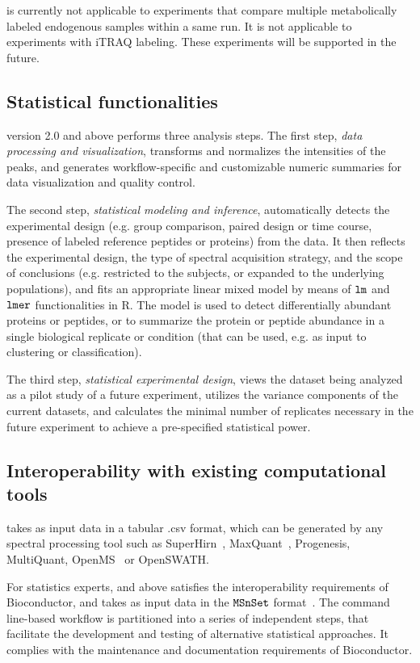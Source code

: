 \documentclass[11pt]{article}
\begin{document}
\m is currently not applicable to experiments that compare multiple metabolically labeled endogenous samples within a same run. It is not applicable to experiments with iTRAQ labeling. These experiments will be supported in the future.

\subsection*{Statistical functionalities}

\m version 2.0 and above performs three analysis steps. The first step, {\it data processing and visualization}, transforms and normalizes the intensities of the peaks, and generates workflow-specific and customizable numeric summaries for data visualization and quality control. 

The second step, {\it statistical modeling and inference}, automatically detects the experimental design (e.g. group comparison, paired design or time course, presence of labeled reference peptides or proteins) from the data. It then reflects the experimental design, the type of spectral acquisition strategy, and the scope of conclusions (e.g. restricted to the subjects, or expanded to the underlying populations), and fits an appropriate linear mixed model by means of $\tt{lm}$ and $\tt{lmer}$ functionalities in R. The model is used to detect differentially abundant proteins or peptides, or to summarize the protein or peptide abundance in a single biological replicate or condition (that can be used, e.g. as input to clustering or classification).

The third step, {\it statistical experimental design}, views the dataset being analyzed as a pilot study of a future experiment, utilizes the variance components of the current datasets, and calculates the minimal number of replicates necessary in the future experiment to achieve a pre-specified statistical power.

\subsection*{Interoperability with existing computational tools}

\m takes as input data in a tabular .csv format, which can be generated by any spectral processing tool such as SuperHirn~\citep{Mueller:2007fo}, MaxQuant~\citep{Cox:2008ir}, Progenesis, MultiQuant, OpenMS~\citep{Sturm:2008eu} or OpenSWATH.

For statistics experts,  and above satisfies the interoperability requirements of Bioconductor, and takes as input data in the $\tt{MSnSet}$ format~\citep{Gatto:2012tj}. The command line-based workflow is partitioned into a series of independent steps, that facilitate the development and testing of alternative statistical approaches. It complies with the maintenance and documentation requirements of Bioconductor.  
\end{document}
